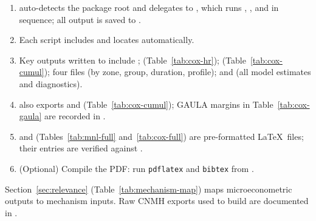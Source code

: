 \documentclass[12pt]{article}
\numberwithin{equation}{section}
\numberwithin{table}{section}
\begin{document}
\begin{sloppypar}
\begin{enumerate}
\item {} auto-detects the package root and delegates to
  , which runs ,
  , and 
  in sequence; all output is saved to .
\item Each script includes  and locates
   automatically.
\item Key outputs written to  include
  ; 
  (Table~\ref{tab:cox-hr}); 
  (Table~\ref{tab:cox-cumul}); four  files
  (by zone, group, duration, profile); and 
  (all model estimates and diagnostics).
\item {} also exports
   and 
  (Table~\ref{tab:cox-cumul}); GAULA margins in Table~\ref{tab:cox-gaula}
  are recorded in .
\item {} and 
  (Tables~\ref{tab:mnl-full} and~\ref{tab:cox-full}) are pre-formatted
  \LaTeX\ files; their entries are verified against .
\item (Optional) Compile the PDF: run \texttt{pdflatex} and \texttt{bibtex}
  from .
\end{enumerate}
\end{sloppypar}

\begin{sloppypar}
Section~\ref{sec:relevance} (Table~\ref{tab:mechanism-map}) maps
microeconometric outputs to mechanism inputs. Raw CNMH exports used to build
 are documented in .
\end{sloppypar}



\end{document}
